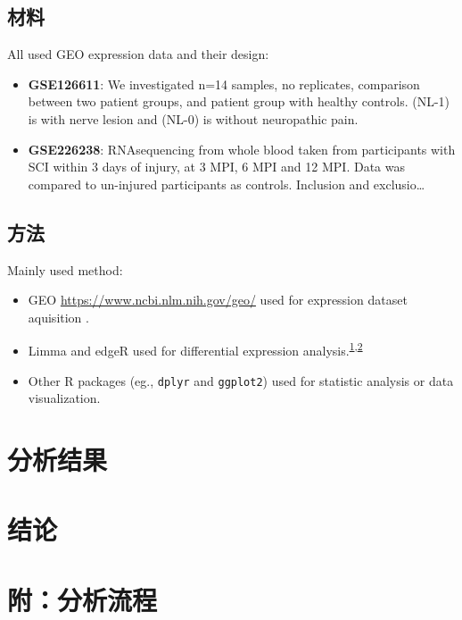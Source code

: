 \documentclass[
]{article}
\providecommand{\tightlist}{%
  \setlength{\itemsep}{0pt}\setlength{\parskip}{0pt}}
\begin{document}
\hypertarget{ux6750ux6599}{%
\subsection{材料}\label{ux6750ux6599}}

All used GEO expression data and their design:

\begin{itemize}
\item
  \textbf{GSE126611}: We investigated n=14 samples, no replicates, comparison between two patient groups, and patient group with healthy controls. (NL-1) is with nerve lesion and (NL-0) is without neuropathic pain.
\item
  \textbf{GSE226238}: RNAsequencing from whole blood taken from participants with SCI within 3 days of injury, at 3 MPI, 6 MPI and 12 MPI. Data was compared to un-injured participants as controls. Inclusion and exclusio\ldots{}
\end{itemize}

\hypertarget{ux65b9ux6cd5}{%
\subsection{方法}\label{ux65b9ux6cd5}}

Mainly used method:

\begin{itemize}
\tightlist
\item
  GEO \url{https://www.ncbi.nlm.nih.gov/geo/} used for expression dataset aquisition .
\item
  Limma and edgeR used for differential expression analysis.\textsuperscript{\protect\hyperlink{ref-LimmaPowersDiRitchi2015}{1},\protect\hyperlink{ref-EdgerDifferenChen}{2}}
\item
  Other R packages (eg., \texttt{dplyr} and \texttt{ggplot2}) used for statistic analysis or data visualization.
\end{itemize}

\hypertarget{results}{%
\section{分析结果}\label{results}}

\hypertarget{dis}{%
\section{结论}\label{dis}}

\hypertarget{workflow}{%
\section{附：分析流程}\label{workflow}}
\end{document}
